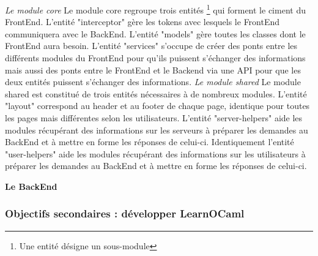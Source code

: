 \documentclass{article}
\begin{document}
\newpage
\textit{Le module core}
\newline
\newline
Le module core regroupe trois entités \footnote{\label{entites} Une entité désigne un sous-module} qui forment le ciment du FrontEnd.
\newline
L'entité "interceptor" gère les tokens avec lesquels le FrontEnd communiquera avec le BackEnd.
\newline
L'entité "models" gère toutes les classes dont le FrontEnd aura besoin.
\newline
L'entité "services" s'occupe de créer des ponts entre les différents modules du FrontEnd pour qu'ils puissent s'échanger des informations mais aussi des ponts entre le FrontEnd et le Backend via une API pour que les deux entités puissent s'échanger des informations.
\newline
\newline
\textit{Le module shared}
\newline
\newline
Le module shared est constitué de trois entités nécessaires à de nombreux modules.
\newline
L'entité "layout" correspond au header et au footer de chaque page, identique pour toutes les pages mais différentes selon les utilisateurs.
\newline
L'entité "server-helpers" aide les modules récupérant des informations sur les serveurs à préparer les demandes au BackEnd et à mettre en forme les réponses de celui-ci.
\newline
Identiquement l'entité "user-helpers" aide les modules récupérant des informations sur les utilisateurs à préparer les demandes au BackEnd et à mettre en forme les réponses de celui-ci.
\newpage

\textbf{Le BackEnd}
\newline
\newline

\subsubsection{Objectifs secondaires : développer LearnOCaml}
\end{document}
